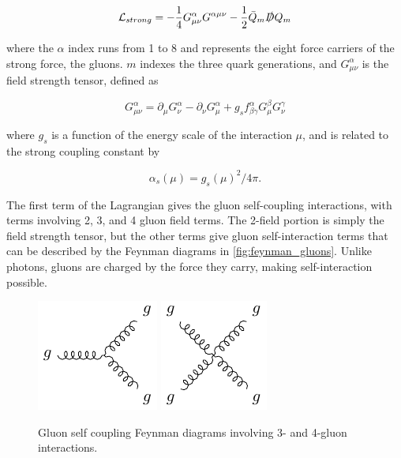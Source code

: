 \begin{equation}
\mathcal{L}_{strong} = -\frac{1}{4}G^\alpha_{\mu\nu}G^{\alpha\mu\nu} - \frac{1}{2}\bar{Q}_m \slashed{D} Q_m
\end{equation}

where the $\alpha$ index runs from 1 to 8 and represents the eight force carriers of the strong force, the gluons. $m$ indexes the three quark generations, and $G^\alpha_{\mu\nu}$ is the field strength tensor, defined as

\begin{equation}
G^\alpha_{\mu\nu} = \partial_\mu G^\alpha_\nu - \partial_\nu G^\alpha_\mu + g_s f^\alpha_{\beta\gamma}G^\beta_\mu G^\gamma_\nu
\end{equation}

where $g_s$ is a function of the energy scale of the interaction $\mu$, and is related to the strong coupling constant by

\begin{equation}
\alpha_s(\mu) =  g_s(\mu)^2 / 4\pi . 
\end{equation}

The first term of the Lagrangian gives the gluon self-coupling interactions, with terms involving 2, 3, and 4 gluon field terms. The 2-field portion is simply the field strength tensor, but the other terms give gluon self-interaction terms that can be described by the Feynman diagrams in \autoref{fig:feynman_gluons}. Unlike photons, gluons are charged by the force they carry, making self-interaction possible. 

\begin{centering}
\begin{figure}[!hbt]
\myfloatalign
\includegraphics[width=.45\linewidth]{feynman/gluon_3.pdf}
\includegraphics[width=.4\linewidth]{feynman/gluon_4.pdf}
\caption{Gluon self coupling Feynman diagrams involving 3- and 4-gluon interactions.}
\label{fig:feynman_gluons}
\end{figure}
\end{centering}

